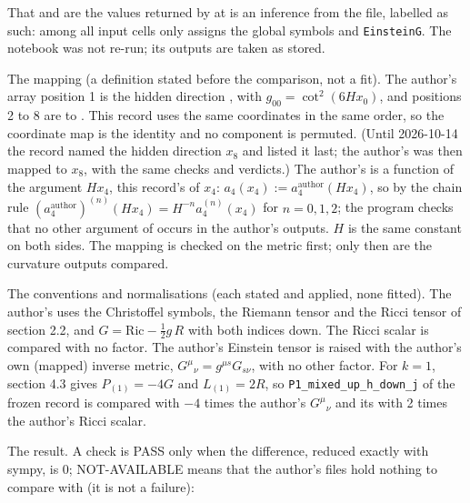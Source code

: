 \documentclass[11pt]{article}
\begin{document}
That \texttt{} and \texttt{} are the values returned by \texttt{} at \texttt{} is an inference from the file, labelled as such: among all input cells only \texttt{} assigns the global symbols \texttt{} and \texttt{Einstein\allowbreak{}G}. The notebook was not re-run; its outputs are taken as stored.

The mapping (a definition stated before the comparison, not a fit). The author's array position 1 is the hidden direction \texttt{}, with $g_{00} = \cot^2(6Hx_0)$, and positions 2 to 8 are \texttt{} to \texttt{}. This record uses the same coordinates in the same order, so the coordinate map is the identity and no component is permuted. (Until 2026-10-14 the record named the hidden direction $x_8$ and listed it last; the author's \texttt{} was then mapped to $x_8$, with the same checks and verdicts.) The author's \texttt{} is a function of the argument $Hx_4$, this record's of $x_4$: $a_4(x_4) := a_4^{\mathrm{author}}(Hx_4)$, so by the chain rule $(a_4^{\mathrm{author}})^{(n)}(Hx_4) = H^{-n}a_4^{(n)}(x_4)$ for $n = 0, 1, 2$; the program checks that no other argument of \texttt{} occurs in the author's outputs. $H$ is the same constant on both sides. The mapping is checked on the metric first; only then are the curvature outputs compared.

The conventions and normalisations (each stated and applied, none fitted). The author's \texttt{} uses the Christoffel symbols, the Riemann tensor and the Ricci tensor of section 2.2, and $G = \mathrm{Ric} - \frac12 g\,R$ with both indices down. The Ricci scalar is compared with no factor. The author's Einstein tensor is raised with the author's own (mapped) inverse metric, $G^\mu{}_\nu = g^{\mu s}G_{s\nu}$, with no other factor. For $k = 1$, section 4.3 gives $P_{(1)} = -4G$ and $L_{(1)} = 2R$, so \texttt{P1\_mixed\allowbreak{}\_up\_h\_do\allowbreak{}wn\_j} of the frozen record is compared with $-4$ times the author's $G^\mu{}_\nu$ and its \texttt{} with 2 times the author's Ricci scalar.

The result. A check is PASS only when the difference, reduced exactly with sympy, is 0; NOT-AVAILABLE means that the author's files hold nothing to compare with (it is not a failure):
\end{document}
